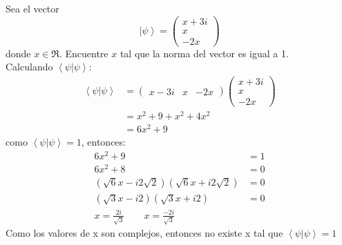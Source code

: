 \documentclass[12pt,letterpaper]{report}
\begin{document}
Sea el vector 
\begin{equation*}
    \left| \psi \right\rangle = \left(\begin{matrix}
        x+3i \\ x\\ -2x
    \end{matrix} \right)
\end{equation*}
donde $x\in \Re $. Encuentre $x$ tal que la norma del vector es igual a 1.\\
Calculando $\left\langle \psi | \psi \right\rangle $:
\begin{align*}
    \left\langle \psi | \psi \right\rangle &= \left(\begin{matrix}
        x-3i & x & -2x
    \end{matrix} \right)\left(\begin{matrix}
        x+3i \\ x \\ -2x
    \end{matrix} \right)\\
    & = x^2+9+x^2+4x^2 \\
    & = 6x^2+9 
\end{align*}
como $\left\langle \psi | \psi \right\rangle=1$, entonces:
\begin{align*}
    6x^2+9&=1\\
    6x^2+8&=0\\
    \left(\sqrt{6}x-i2\sqrt{2}\right)\left(\sqrt{6}x+i2\sqrt{2}\right)&=0 \\
    \left(\sqrt{3}x-i2\right)\left(\sqrt{3}x+i2\right)&=0 \\
    x=\frac{2i}{\sqrt{3}} \qquad x=\frac{-2i}{\sqrt{3}}
\end{align*}
Como los valores de x son complejos, entonces no existe x tal que $\left\langle \psi | \psi \right\rangle =1$
\end{document}
